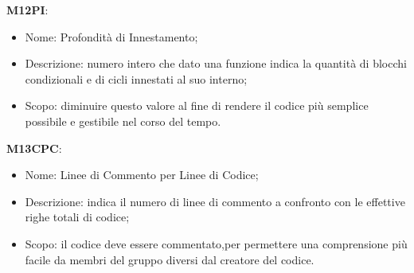     \textbf{M12PI}:
    \begin{itemize}
      \item Nome: Profondità di Innestamento;
      \item Descrizione: numero intero che dato una funzione indica la quantità di blocchi condizionali e di cicli innestati al suo interno;
      \item Scopo: diminuire questo valore al fine di rendere il codice più semplice possibile e gestibile nel corso del tempo.
    \end{itemize}
    \textbf{M13CPC}:
    \begin{itemize}
      \item Nome: Linee di Commento per Linee di Codice;
      \item Descrizione: indica il numero di linee di commento a confronto con le effettive righe totali di codice;
      \item Scopo: il codice deve essere commentato,per permettere una comprensione più facile da membri del gruppo diversi dal creatore del codice.
    \end{itemize}

			